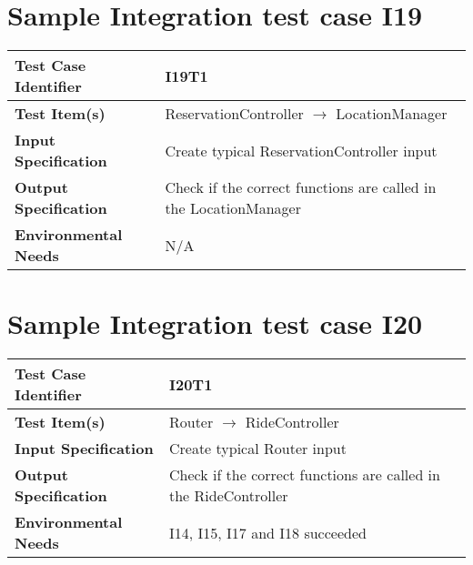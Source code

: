 \section{Sample Integration test case I19}\label{I19}
\begin{center}
	\vspace{0.6cm}
	\begin{tabular}{|l|l|}
		\hline
		\textbf{Test Case Identifier} & I19T1 \bigstrut \\\hline
		\textbf{Test Item(s)} & ReservationController \ensuremath{\rightarrow} LocationManager \bigstrut \\\hline
		\textbf{Input Specification} & Create typical ReservationController input \bigstrut \\\hline
		\textbf{Output Specification} & Check if the correct functions are called in the LocationManager \bigstrut \\\hline
		\textbf{Environmental Needs} & N/A \bigstrut \\\hline
	\end{tabular}
\end{center}

\section{Sample Integration test case I20}\label{I20}
\begin{center}
	\vspace{0.6cm}
	\begin{tabular}{|l|l|}
		\hline
		\textbf{Test Case Identifier} & I20T1 \bigstrut \\\hline
		\textbf{Test Item(s)} & Router \ensuremath{\rightarrow} RideController \bigstrut \\\hline
		\textbf{Input Specification} & Create typical Router input \bigstrut \\\hline
		\textbf{Output Specification} & Check if the correct functions are called in the RideController \bigstrut \\\hline
		\textbf{Environmental Needs} & I14, I15, I17 and I18 succeeded \bigstrut \\\hline
	\end{tabular}
\end{center}

